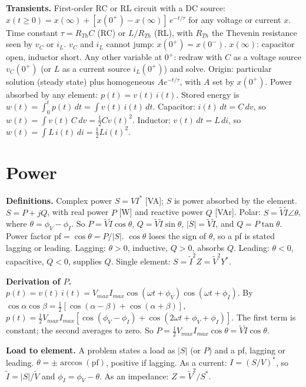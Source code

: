\documentclass{article}
\newcommand{\abs}[1]{\lvert#1\rvert}
\begin{document}
\textbf{Transients.}
First-order RC or RL circuit with a DC source: $x(t\geq 0) = x(\infty) + [x(0^+) - x(\infty)]\,e^{-t/\tau}$ for any voltage or current $x$.
Time constant $\tau = R_{Th}C$ (RC) or $L/R_{Th}$ (RL), with $R_{Th}$ the Thevenin resistance seen by $v_C$ or $i_L$.
$v_C$ and $i_L$ cannot jump: $x(0^+) = x(0^-)$.
$x(\infty)$: capacitor open, inductor short.
Any other variable at $0^+$: redraw with $C$ as a voltage source $v_C(0^+)$ (or $L$ as a current source $i_L(0^+)$) and solve.
Origin: particular solution (steady state) plus homogeneous $Ae^{-t/\tau}$, with $A$ set by $x(0^+)$.
Power absorbed by any element: $p(t) = v(t)\,i(t)$.
Stored energy is $w(t) = \int_0^t p(t)\,dt = \int v(t)\,i(t)\,dt$.
Capacitor: $i(t)\,dt = C\,dv$, so $w(t) = \int v(t)\,C\,dv = \tfrac12 C v(t)^2$.
Inductor: $v(t)\,dt = L\,di$, so $w(t) = \int L\,i(t)\,di = \tfrac12 L i(t)^2$.



\section{Power}
\textbf{Definitions.}
Complex power $S = VI^*$ [VA]; $S$ is power absorbed by the element.
$S = P + jQ$, with real power $P$ [W] and reactive power $Q$ [VAr].
Polar: $S = \tilde V\tilde I\angle\theta$, where $\theta = \phi_V - \phi_I$.
So $P = \tilde V\tilde I\cos\theta$, $Q = \tilde V\tilde I\sin\theta$, $\abs S = \tilde V\tilde I$, and $Q = P\tan\theta$.
Power factor $\mathrm{pf} = \cos\theta = P/\abs S$.
$\cos\theta$ loses the sign of $\theta$, so a pf is stated lagging or leading.
Lagging: $\theta > 0$, inductive, $Q > 0$, absorbs $Q$.
Leading: $\theta < 0$, capacitive, $Q < 0$, supplies $Q$.
Single element: $S = \tilde I^2 Z = \tilde V^2Y^*$.

\textbf{Derivation of $P$.}
$p(t) = v(t)\,i(t) = V_{max}I_{max}\cos(\omega t + \phi_V)\cos(\omega t + \phi_I)$.
By $\cos\alpha\cos\beta = \tfrac12[\cos(\alpha - \beta) + \cos(\alpha + \beta)]$, $p(t) = \tfrac12 V_{max}I_{max}[\cos(\phi_V - \phi_I) + \cos(2\omega t + \phi_V + \phi_I)]$.
The first term is constant; the second averages to zero.
So $P = \tfrac12 V_{max}I_{max}\cos\theta = \tilde V\tilde I\cos\theta$.

\textbf{Load to element.}
A problem states a load as $\abs S$ (or $P$) and a pf, lagging or leading.
$\theta = \pm\arccos(\mathrm{pf})$, positive if lagging.
As a current: $I = (S/V)^*$, so $\tilde I = \abs S/\tilde V$ and $\phi_I = \phi_V - \theta$.
As an impedance: $Z = \tilde V^2/S^*$.
\end{document}
